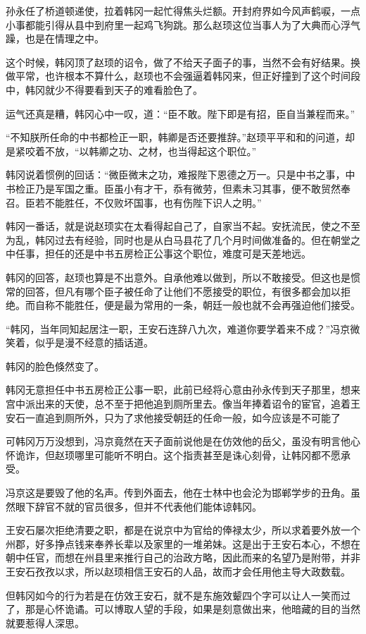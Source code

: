 孙永任了桥道顿递使，拉着韩冈一起忙得焦头烂额。开封府界如今风声鹤唳，一点小事都能引得从县中到府里一起鸡飞狗跳。那么赵顼这位当事人为了大典而心浮气躁，也是在情理之中。

这个时候，韩冈顶了赵顼的诏令，做了不给天子面子的事，当然不会有好结果。换做平常，也许根本不算什么，赵顼也不会强逼着韩冈来，但正好撞到了这个时间段中，韩冈就少不得要看到天子的难看脸色了。

运气还真是糟，韩冈心中一叹，道：“臣不敢。陛下即是有招，臣自当兼程而来。”

“不知朕所任命的中书都检正一职，韩卿是否还要推辞。”赵顼平平和和的问道，却是紧咬着不放，“以韩卿之功、之材，也当得起这个职位。”

韩冈说着惯例的回话：“微臣微末之功，难报陛下恩德之万一。只是中书之事，中书检正乃是军国之重。臣虽小有才干，忝有微劳，但素未习其事，便不敢贸然奉召。臣若不能胜任，不仅败坏国事，也有伤陛下识人之明。”

韩冈一番话，就是说赵顼实在太看得起自己了，自家当不起。安抚流民，使之不至为乱，韩冈过去有经验，同时也是从白马县花了几个月时间做准备的。但在朝堂之中任事，担任的还是中书五房检正公事这个职位，难度可是天差地远。

韩冈的回答，赵顼也算是不出意外。自承他难以做到，所以不敢接受。但这也是惯常的回答，但凡有哪个臣子被任命了让他们不愿接受的职位，有很多都会加以拒绝。而自称不能胜任，便是最为常用的一条，朝廷一般也就不会再强迫他们接受。

“韩冈，当年同知起居注一职，王安石连辞八九次，难道你要学着来不成？”冯京微笑着，似乎是漫不经意的插话道。

韩冈的脸色倏然变了。

韩冈无意担任中书五房检正公事一职，此前已经将心意由孙永传到天子那里，想来宫中派出来的天使，总不至于把他追到厕所里去。像当年捧着诏令的宦官，追着王安石一直追到厕所外，只为了求他接受朝廷的任命一般，如今应该是不可能了

可韩冈万万没想到，冯京竟然在天子面前说他是在仿效他的岳父，虽没有明言他心怀诡诈，但赵顼哪里可能听不明白。这个指责甚至是诛心刻骨，让韩冈都不愿承受。

冯京这是要毁了他的名声。传到外面去，他在士林中也会沦为邯郸学步的丑角。虽然眼下辞官不就的官员很多，但并不代表他们能体谅韩冈。

王安石屡次拒绝清要之职，都是在说京中为官给的俸禄太少，所以求着要外放一个州郡，好多挣点钱来奉养长辈以及家里的一堆弟妹。这是出于王安石本心，不想在朝中任官，而想在州县里来推行自己的治政方略，因此而来的名望乃是附带，并非王安石孜孜以求，所以赵顼相信王安石的人品，故而才会任用他主导大政数载。

但韩冈如今的行为若是在仿效王安石，就不是东施效颦四个字可以让人一笑而过了，那是心怀诡谲。可以博取人望的手段，如果是刻意做出来，他暗藏的目的当然就要惹得人深思。

